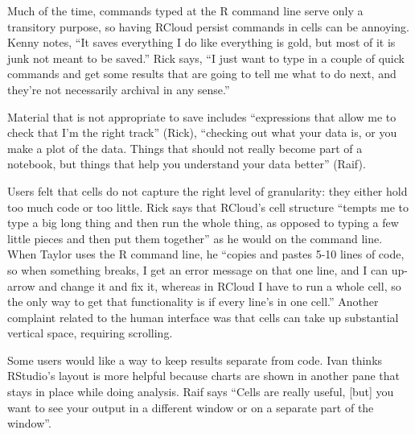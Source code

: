 
Much of the time, commands typed at the R command line serve only a transitory
purpose, so having RCloud persist commands in cells can be annoying.
Kenny notes, ``It saves everything I do like everything is gold, but most
of it is junk not meant to be saved.'' Rick says, ``I just want to type in a
couple of quick commands and get some results that are going to tell
me what to do next, and they're not necessarily archival in any sense.''

Material that is not appropriate to save includes ``expressions that allow
me to check that I'm the right track'' (Rick), ``checking out what your data is,
or you make a plot of the data. Things that should not really become part of a
notebook, but things that help you understand your data better'' (Raif).

Users felt that cells do not capture the right level of granularity: they
either hold too much code or too little. Rick says that RCloud's cell structure
``tempts me to type a big long thing and then run the whole thing, as opposed to
typing a few little pieces and then put them together'' as he would on the command line.
When Taylor uses the R command line, he ``copies and pastes 5-10 lines of code,
so when something breaks, I get an error message on that one line, and I can
up-arrow and change it and fix it, whereas in RCloud I have to run a whole cell,
so the only way to get that functionality is if every line's in one cell.''
Another complaint related to the human interface was that cells can take up
substantial vertical space, requiring scrolling.

Some users would like a way to keep results separate from code.
Ivan thinks RStudio's layout is more helpful because charts
are shown in another pane that stays in place while doing analysis. Raif says
``Cells are really useful, [but] you want to see your output in a different
window or on a separate part of the window''.

